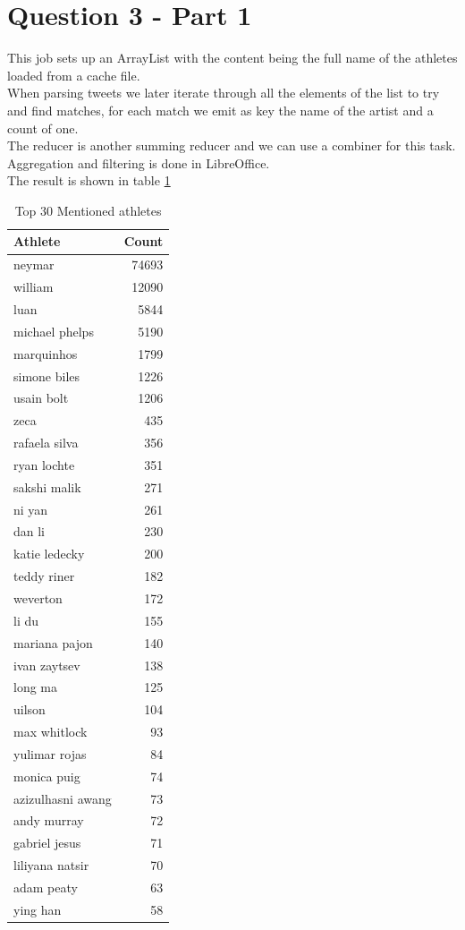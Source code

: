\documentclass[12pt]{article}
\begin{document}
\section{Question 3 - Part 1}

This job sets up an ArrayList with the content being the full name of the athletes loaded from a cache file. \\
When parsing tweets we later iterate through all the elements of the list to try and find matches, for each match we emit as key the name of the artist and a count of one. \\
The reducer is another summing reducer and we can use a combiner for this task. Aggregation and filtering is done in LibreOffice. \\ 
The result is shown in table \ref{table:top_athletes}

\begin{table}[ht]
\centering
\caption{Top 30 Mentioned athletes}
\label{table:top_athletes}
\begin{tabular}{ l r }
\hline
Athlete & Count \\
\hline
neymar &	74693 \\
william &	12090 \\
luan &	5844 \\
michael phelps &	5190 \\
marquinhos &	1799 \\
simone biles &	1226 \\
usain bolt &	1206 \\
zeca &	435 \\
rafaela silva &	356 \\
ryan lochte &	351 \\
sakshi malik &	271 \\
ni yan &	261 \\
dan li &	230 \\
katie ledecky &	200 \\
teddy riner &	182 \\
weverton &	172 \\
li du &	155 \\
mariana pajon &	140 \\
ivan zaytsev &	138 \\
long ma &	125 \\
uilson &	104 \\
max whitlock &	93 \\
yulimar rojas &	84 \\
monica puig &	74 \\
azizulhasni awang &	73 \\
andy murray &	72 \\
gabriel jesus &	71 \\
liliyana natsir &	70 \\
adam peaty &	63 \\
ying han &	58 \\

\end{tabular}
\end{table}
\end{document}
